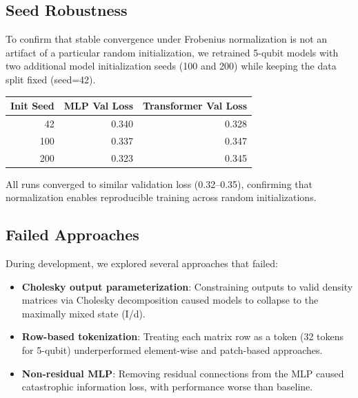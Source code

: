 \documentclass[11pt]{article}
\begin{document}
\subsection{Seed Robustness}
\label{sec:org02367b6}
To confirm that stable convergence under Frobenius normalization is not an artifact of a particular random initialization, we retrained 5-qubit models with two additional model initialization seeds (100 and 200) while keeping the data split fixed (seed=42).

\begin{center}
\begin{tabular}{rrr}
Init Seed & MLP Val Loss & Transformer Val Loss\\
\hline
42 & 0.340 & 0.328\\
100 & 0.337 & 0.347\\
200 & 0.323 & 0.345\\
\end{tabular}
\end{center}

All runs converged to similar validation loss (0.32--0.35), confirming that normalization enables reproducible training across random initializations.
\subsection{Failed Approaches}
\label{sec:orgaad5aee}

During development, we explored several approaches that failed:

\begin{itemize}
\item \textbf{Cholesky output parameterization}: Constraining outputs to valid density matrices via Cholesky decomposition caused models to collapse to the maximally mixed state (I/d).
\item \textbf{Row-based tokenization}: Treating each matrix row as a token (32 tokens for 5-qubit) underperformed element-wise and patch-based approaches.
\item \textbf{Non-residual MLP}: Removing residual connections from the MLP caused catastrophic information loss, with performance worse than baseline.
\end{itemize}
\printbibliography
\end{document}
